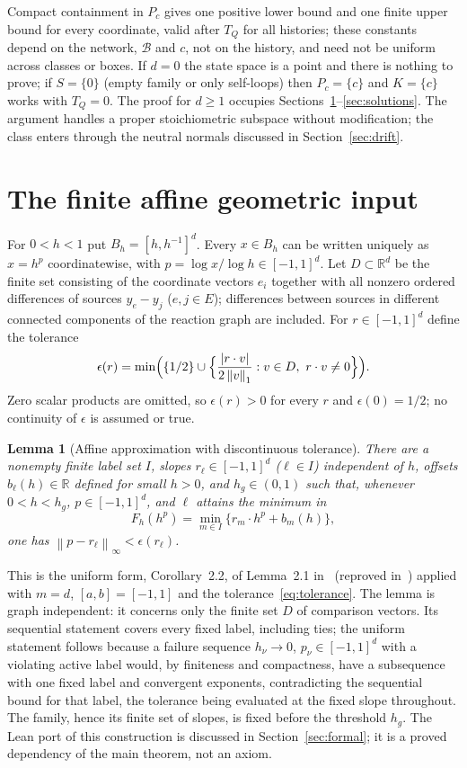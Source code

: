 \documentclass[11pt]{article}
\newtheorem{lemma}[theorem]{Lemma}
\theoremstyle{definition}
\theoremstyle{remark}
\newcommand{\R}{\mathbb R}
\newcommand{\B}{\mathcal B}
\newcommand{\norm}[1]{\left\|#1\right\|}
\begin{document}
Compact containment in $P_c$ gives one positive lower bound and one finite upper
bound for every coordinate, valid after $T_Q$ for all histories; these constants
depend on the network, $\B$ and $c$, not on the history, and need not be uniform
across classes or boxes. If $d=0$ the state space is a point and there is nothing
to prove; if $S=\{0\}$ (empty family or only self-loops) then $P_c=\{c\}$ and
$K=\{c\}$ works with $T_Q=0$. The proof for $d\ge1$ occupies
Sections~\ref{sec:affine}--\ref{sec:solutions}. The argument handles a proper
stoichiometric subspace without modification; the class enters through the
neutral normals discussed in Section~\ref{sec:drift}.

\section{The finite affine geometric input}\label{sec:affine}

For $0<h<1$ put $B_h=[h,h^{-1}]^d$. Every $x\in B_h$ can be written uniquely as
$x=h^{p}$ coordinatewise, with $p=\log x/\log h\in[-1,1]^d$. Let $D\subset\R^d$ be
the finite set consisting of the coordinate vectors $e_i$ together with all nonzero
ordered differences of sources $y_e-y_j$ ($e,j\in E$); differences between sources
in different connected components of the reaction graph are included. For
$r\in[-1,1]^d$ define the tolerance
\begin{equation}\label{eq:tolerance}
 \epsilon(r)=\min\Bigl(\{1/2\}\cup
 \Bigl\{\frac{|r\cdot v|}{2\norm{v}_1}:v\in D,\ r\cdot v\ne0\Bigr\}\Bigr).
\end{equation}
Zero scalar products are omitted, so $\epsilon(r)>0$ for every $r$ and
$\epsilon(0)=1/2$; no continuity of $\epsilon$ is assumed or true.

\begin{lemma}[Affine approximation with discontinuous tolerance]\label{lem:affine}
There are a nonempty finite label set $I$, slopes $r_\ell\in[-1,1]^d$ ($\ell\in I$)
independent of $h$, offsets $b_\ell(h)\in\R$ defined for small $h>0$, and
$h_g\in(0,1)$ such that, whenever $0<h<h_g$, $p\in[-1,1]^d$, and $\ell$ attains the
minimum in
\[
 F_h(h^{p})=\min_{m\in I}\bigl\{r_m\cdot h^{p}+b_m(h)\bigr\},
\]
one has $\norm{p-r_\ell}_\infty<\epsilon(r_\ell)$.
\end{lemma}

This is the uniform form, Corollary~2.2, of Lemma~2.1 in~\cite{OpenAI2026Boundedness}
(reproved in~\cite[Section~2]{OpenAI2026Uniform}) applied with $m=d$, $[a,b]=[-1,1]$
and the tolerance~\eqref{eq:tolerance}. The lemma is graph independent: it concerns
only the finite set $D$ of comparison vectors. Its sequential statement covers every
fixed label, including ties; the uniform statement follows because a failure
sequence $h_\nu\to0$, $p_\nu\in[-1,1]^d$ with a violating active label would, by
finiteness and compactness, have a subsequence with one fixed label and convergent
exponents, contradicting the sequential bound for that label, the tolerance being
evaluated at the fixed slope throughout. The family, hence its finite set of slopes,
is fixed before the threshold $h_g$. The Lean port of this construction is
discussed in Section~\ref{sec:formal}; it is a proved dependency of the main
theorem, not an axiom.
\end{document}
